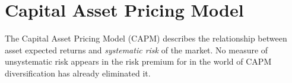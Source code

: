 %
%
%
%

\section{Capital Asset Pricing Model}
\label{sec:capm}
The Capital Asset Pricing Model (CAPM) describes the relationship between asset expected returns and \emph{systematic risk} of the market. No measure of unsystematic risk appears in the risk premium for in the world of CAPM diversification has already eliminated it.

